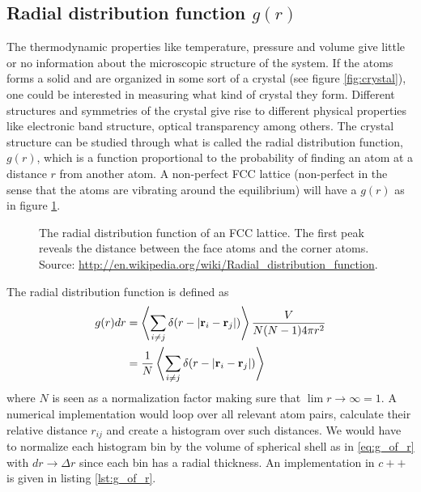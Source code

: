 \subsection{Radial distribution function $g(r)$}
The thermodynamic properties like temperature, pressure and volume give little or no information about the microscopic structure of the system. If the atoms forms a solid and are organized in some sort of a crystal (see figure \ref{fig:crystal}), one could be interested in measuring what kind of crystal they form. Different structures and symmetries of the crystal give rise to different physical properties like electronic band structure, optical transparency among others\cite{kittel1996introduction}. The crystal structure can be studied through what is called the radial distribution function, $g(r)$, which is a function proportional to the probability of finding an atom at a distance $r$ from another atom. A non-perfect FCC lattice (non-perfect in the sense that the atoms are vibrating around the equilibrium) will have a $g(r)$ as in figure \ref{fig:fcc_lattice_g_of_r}.\\
\begin{figure}[h]
\label{fig:fcc_lattice_g_of_r}
\centering
\caption{The radial distribution function of an FCC lattice. The first peak reveals the distance between the face atoms and the corner atoms. Source: \url{http://en.wikipedia.org/wiki/Radial_distribution_function}.}
\end{figure}
The radial distribution function is defined as
\begin{align}
    \label{eq:g_of_r}
    g(r)dr &= \left\langle \sum_{i\neq j}\delta(r - |\vec r_i - \vec r_j|)\right\rangle{V\over N(N-1)4\pi r^2}\\
    &= {1 \over N} \left\langle \sum_{i\neq j}\delta(r - |\vec r_i - \vec r_j|)\right\rangle
\end{align}
where $N$ is seen as a normalization factor making sure that $\lim r\rightarrow \infty = 1$. A numerical implementation would loop over all relevant atom pairs, calculate their relative distance $r_{ij}$ and create a histogram over such distances. We would have to normalize each histogram bin by the volume of spherical shell as in \eqref{eq:g_of_r} with $dr\rightarrow \Delta r$ since each bin has a radial thickness. An implementation in $c++$ is given in  listing \ref{lst:g_of_r}.

